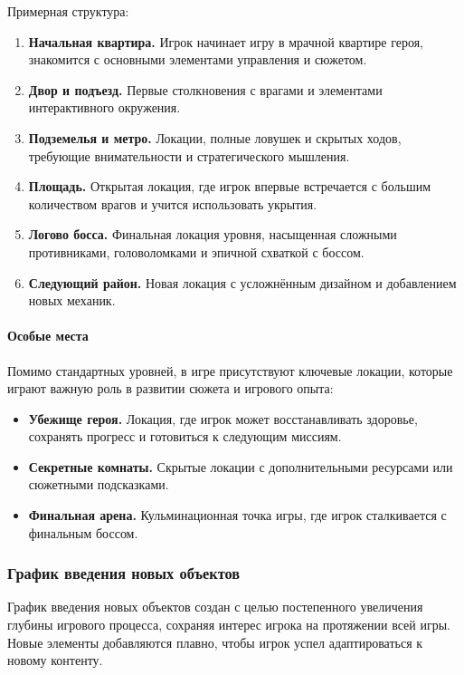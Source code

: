 \documentclass[12pt]{article}
\begin{document}
        Примерная структура:  
        \begin{enumerate}
            \item \textbf{Начальная квартира.} Игрок начинает игру в мрачной квартире героя, знакомится с основными элементами управления и сюжетом.  
            \item \textbf{Двор и подъезд.} Первые столкновения с врагами и элементами интерактивного окружения.  
            \item \textbf{Подземелья и метро.} Локации, полные ловушек и скрытых ходов, требующие внимательности и стратегического мышления.  
            \item \textbf{Площадь.} Открытая локация, где игрок впервые встречается с большим количеством врагов и учится использовать укрытия.  
            \item \textbf{Логово босса.} Финальная локация уровня, насыщенная сложными противниками, головоломками и эпичной схваткой с боссом.  
            \item \textbf{Следующий район.} Новая локация с усложнённым дизайном и добавлением новых механик.  
        \end{enumerate}
        
        \paragraph{Особые места}  
        Помимо стандартных уровней, в игре присутствуют ключевые локации, которые играют важную роль в развитии сюжета и игрового опыта:  
        \begin{itemize}
            \item \textbf{Убежище героя.} Локация, где игрок может восстанавливать здоровье, сохранять прогресс и готовиться к следующим миссиям.  
            \item \textbf{Секретные комнаты.} Скрытые локации с дополнительными ресурсами или сюжетными подсказками.  
            \item \textbf{Финальная арена.} Кульминационная точка игры, где игрок сталкивается с финальным боссом.  
        \end{itemize}
        
        \subsubsection{График введения новых объектов}

График введения новых объектов создан с целью постепенного увеличения глубины игрового процесса, сохраняя интерес игрока на протяжении всей игры. Новые элементы добавляются плавно, чтобы игрок успел адаптироваться к новому контенту.
\end{document}
